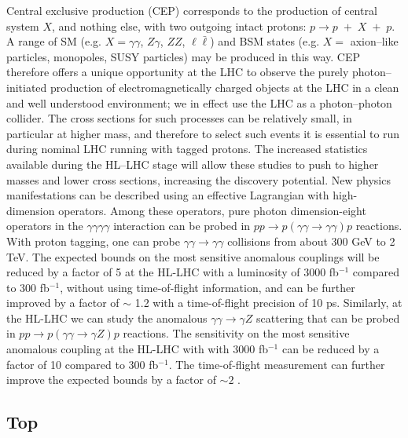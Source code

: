 \documentclass{article}
\begin{document}
Central exclusive production (CEP) corresponds to the production of central system $X$, and nothing else, with two outgoing intact protons: $p \to p \;+\; X \;+\;p$.
A range of SM (e.g. $X = \gamma\gamma$, $Z\gamma$, $ZZ$, $\ell\bar{\ell}$) and BSM states (e.g. $X=$ axion--like particles,  monopoles, SUSY particles) may be produced in this way. CEP therefore offers a unique opportunity at the LHC to observe the purely photon--initiated production of electromagnetically charged objects at the LHC in a clean and well understood environment; we in effect use the LHC as a photon--photon collider. The cross sections for such processes can be relatively small, in particular at higher mass, and therefore to  select such events it is essential to run during nominal LHC running with tagged protons. The increased statistics available during the HL--LHC stage will allow these studies to push to higher masses and lower cross sections, increasing the discovery potential. New physics manifestations can be described using an effective Lagrangian with high-dimension operators. Among these operators, pure photon dimension-eight operators in the $\gamma\gamma\gamma\gamma$ interaction can be probed in $pp\rightarrow p(\gamma\gamma\rightarrow\gamma\gamma)p$ reactions. With proton tagging, one can probe $\gamma\gamma\rightarrow\gamma\gamma$ collisions from about 300 GeV to 2 TeV. 
The expected bounds on the most sensitive anomalous couplings will be reduced by a factor of 5 at the HL-LHC with a luminosity of 3000 fb$^{-1}$ compared to 300 fb$^{-1}$, without using time-of-flight information, and can be further improved by a factor of $\sim$ 1.2 with a time-of-flight precision of 10 ps.
Similarly, at the HL-LHC we can study the anomalous $\gamma\gamma \rightarrow \gamma Z$ scattering that can be probed in $pp\rightarrow p(\gamma\gamma\rightarrow\gamma Z)p$ reactions. The sensitivity on the most sensitive anomalous coupling at the HL-LHC with with 3000 fb$^{-1}$ can be reduced by a factor of 10 compared to 300 fb$^{-1}$. The time-of-flight measurement can further improve the expected bounds by a factor of $\sim 2$ .\\


\subsection{Top}
\end{document}
